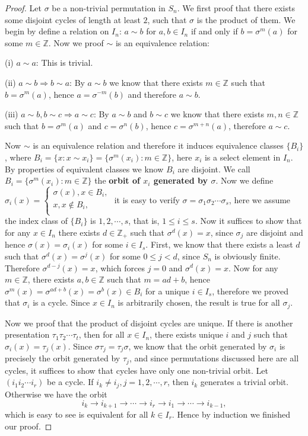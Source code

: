 \begin{proof}
Let $\sigma$ be a non-trivial permutation in $S_n$. We first proof that there exists some disjoint cycles of length at least $2$, such that $\sigma$ is the product of them. We begin by define a relation on $I_n$: $a\sim b$ for $a,b\in I_n$ if and only if $b=\sigma^m(a)$ for some $m\in\mathbb{Z}$. Now we proof $\sim$ is an equivalence relation:\par
(i) $a\sim a$: This is trivial.\par
(ii) $a\sim b\Rightarrow b\sim a$: By $a\sim b$ we know that there exists $m\in\mathbb{Z}$ such that $b=\sigma^m(a)$, hence $a=\sigma^{-m}(b)$ and therefore $a\sim b$.\par
(iii) $a\sim b,b\sim c\Rightarrow a\sim c$: By $a\sim b$ and $b\sim c$ we know that there exists $m,n\in\mathbb{Z}$ such that $b=\sigma^m(a)$ and $c=\sigma^n(b)$, hence $c=\sigma^{m+n}(a)$, therefore $a\sim c$.\par
Now $\sim$ is an equivalence relation and therefore it induces equivalence classes $\{B_i\}$, where $B_i=\{x:x\sim x_i\}=\{\sigma^m(x_i):m\in\mathbb{Z}\}$, here $x_i$ is a select element in $I_n$. By properties of equivalent classes we know $B_i$ are disjoint. We call $B_i=\{\sigma^m(x_i):m\in\mathbb{Z}\}$ the \textbf{orbit of $x_i$ generated by $\sigma$}. Now we define $
\sigma _i\left( x \right) =\begin{cases}
	\sigma \left( x \right) ,x\in B_i,\\
	x,x\notin B_i,\\
\end{cases}
$ it is easy to verify $\sigma=\sigma_1\sigma_2\cdots\sigma_s$, here we assume the index class of $\{B_i\}$ is $1,2,\cdots,s$, that is, $1\le i\le s$. Now it suffices to show that for any $x\in I_n$ there exists $d\in\mathbb{Z}_+$ such that $\sigma^d(x)=x$, since $\sigma_j$ are disjoint and hence $\sigma(x)=\sigma_i(x)$ for some $i\in I_s$. First, we know that there exists a least $d$ such that $\sigma^d(x)=\sigma^j(x)$ for some $0\le j<d$, since $S_n$ is obviously finite. Therefore $\sigma^{d-j}(x)=x$, which forces $j=0$ and $\sigma^d(x)=x$. Now for any $m\in\mathbb{Z}$, there exists $a,b\in\mathbb{Z}$ such that $m=ad+b$, hence $\sigma^m(x)=\sigma^{ad+b}(x)=\sigma^b(x)\in B_i$ for a unique $i\in I_s$, therefore we proved that $\sigma_i$ is a cycle. Since $x\in I_n$ is arbitrarily chosen, the result is true for all $\sigma_j$.\par
Now we proof that the product of disjoint cycles are unique. If there is another presentation $\tau_1\tau_2\cdots\tau_t$, then for all $x\in I_n$, there exists unique $i$ and $j$ such that $\sigma_i(x)=\tau_j(x)$. Since $\sigma\tau_j=\tau_j\sigma$, we know that the orbit generated by $\sigma_i$ is precisely the orbit generated by $\tau_j$, and since permutations discussed here are all cycles, it suffices to show that cycles have only one non-trivial orbit. Let $(i_1i_2\cdots i_r)$ be a cycle. If $i_k\ne i_j,j=1,2,\cdots,r$, then $i_k$ generates a trivial orbit. Otherwise we have the orbit 
$$
i_k\rightarrow i_{k+1}\rightarrow \cdots \rightarrow i_r\rightarrow i_1\rightarrow \cdots \rightarrow i_{k-1},
$$
which is easy to see is equivalent for all $k\in I_r$. Hence by induction we finished our proof.
\end{proof}
